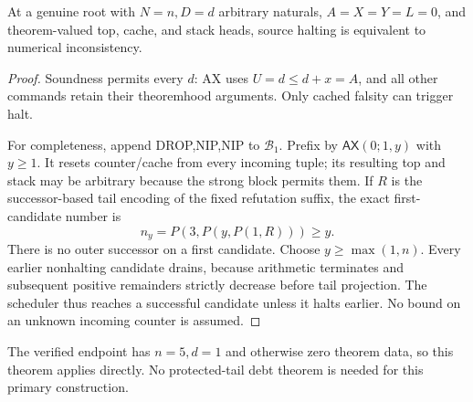 \begin{theorem}
At a genuine root with $N=n,D=d$ arbitrary naturals, $A=X=Y=L=0$, and theorem-valued top, cache, and stack heads, source halting is equivalent to numerical inconsistency.
\end{theorem}
\begin{proof}
Soundness permits every $d$: AX uses $U=d\le d+x=A$, and all other commands retain their theoremhood arguments. Only cached falsity can trigger halt.

For completeness, append DROP,NIP,NIP to $\mathcal B_1$. Prefix by $\mathsf{AX}(0;1,y)$ with $y\ge1$. It resets counter/cache from every incoming tuple; its resulting top and stack may be arbitrary because the strong block permits them. If $R$ is the successor-based tail encoding of the fixed refutation suffix, the exact first-candidate number is
\[
                         n_y=P(3,P(y,P(1,R)))\ge y.
\]
There is no outer successor on a first candidate. Choose $y\ge\max(1,n)$. Every earlier nonhalting candidate drains, because arithmetic terminates and subsequent positive remainders strictly decrease before tail projection. The scheduler thus reaches a successful candidate unless it halts earlier. No bound on an unknown incoming counter is assumed.
\end{proof}
The verified endpoint has $n=5,d=1$ and otherwise zero theorem data, so this theorem applies directly. No protected-tail debt theorem is needed for this primary construction.
